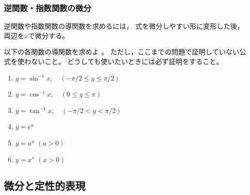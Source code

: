 \documentclass[twocolumn,11pt]{jarticle}
\begin{document}
\subsubsection{逆関数・指数関数の微分}
逆関数や指数関数の導関数を求めるには，
式を微分しやすい形に変形した後，両辺を$x$で微分する。

\nquestion
以下の各関数の導関数を求めよ
。
ただし，ここまでの問題で証明していない公式を使わないこと。
どうしても使いたいときには必ず証明をすること。
\begin{enumerate}
\item \label{ditem:sin-1x}$\displaystyle y=\sin^{-1}x,\quad(-\pi/2\le y\le\pi/2)$
\item \label{ditem:cos-1x}$\displaystyle y=\cos^{-1}x,\quad(0\le y\le\pi)$
\item \label{ditem:tan-1x}$\displaystyle y=\tan^{-1}x,\quad(-\pi/2< y<\pi/2)$
\item \label{ditem:ex}$y=e^x$
\item \label{ditem:ax}$y=a^x$ $(a>0)$
\item \label{ditem:xx}$y=x^x$ $(x>0)$
\end{enumerate}


\subsection{微分と定性的表現}
\end{document}
